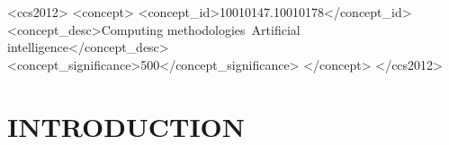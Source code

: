 \documentclass[sigconf]{acmart}
\begin{document}
\begin{CCSXML}
<ccs2012>
  <concept>
      <concept_id>10010147.10010178</concept_id>
      <concept_desc>Computing methodologies~Artificial intelligence</concept_desc>
      <concept_significance>500</concept_significance>
      </concept>
 </ccs2012>
\end{CCSXML}




\maketitle


\section{INTRODUCTION}
\label{intro}
\end{document}
